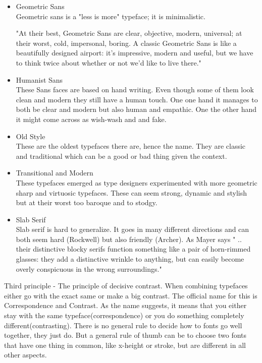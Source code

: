 \begin{itemize}
\item
Geometric Sans
\\
Geometric sans is a "less is more" typeface; it is minimalistic.

"At their best, Geometric Sans are clear, objective, modern, universal; at their worst, cold, impersonal, boring. A classic Geometric Sans is like a beautifully designed airport: it's impressive, modern and useful, but we have to think twice about whether or not we'd like to live there." \cite{Font} %

\item
Humanist Sans
\\
These Sans faces are based on hand writing. Even though some of them look clean and modern they still have a human touch. One one hand it manages to both be clear and modern but also human and empathic. One the other hand it might come across as wish-wash and and fake. \cite{Font}

\item
Old Style
\\
These are the oldest typefaces there are, hence the name. 
They are classic and traditional which can be a good or bad thing given the context. 

\item
Transitional and Modern
\\
These typefaces emerged as type designers experimented with more geometric sharp and virtuosic typefaces. 
These can seem strong, dynamic and stylish but at their worst too baroque and to stodgy. \cite{Font} 

\item
Slab Serif
\\
Slab serif is hard to generalize. It goes in many different directions and can both seem hard (Rockwell) but also friendly (Archer). As Mayer says " .. their distinctive blocky serifs function something like a pair of horn-rimmed glasses: they add a distinctive wrinkle to anything, but can easily become overly conspicuous in the wrong surroundings." \cite{Font}
\end{itemize}

Third principle - The principle of decisive contrast. When combining typefaces either go with the exact same or make a big contrast. The official name for this is Correspondence and Contrast. As the name suggests, it means that you either stay with the same typeface(correspondence) or you do something completely different(contrasting).\cite{Font}
There is no general rule to decide how to fonts go well together, they just do. But a general rule of thumb can be to choose two fonts that have one thing in common, like x-height or stroke, but are different in all other aspects. 


